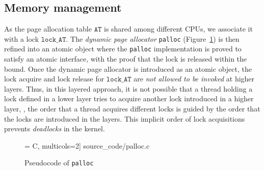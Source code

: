 {\subsection{Memory management}
\label{sec:con:mem}


As the page allocation table $\texttt{AT}$ is shared among different CPUs, 
we associate it with a lock $\texttt{lock\_AT}$.
The \emph{dynamic page allocator}
\texttt{palloc} (\cf Figure~\ref{fig:exp:palloc}) is then refined into an atomic object where
the \texttt{palloc} implementation is proved to satisfy an atomic interface,
with the proof that the lock is released within the bound.
Once the dynamic page allocator is introduced as
 an atomic object, the lock acquire and lock release 
for $\texttt{lock\_AT}$
are \emph{not allowed to be invoked} at higher layers. 
Thus, in this layered approach, it is not possible
that a thread holding a lock defined in a lower layer tries to acquire another lock
introduced in a higher layer, \ie, the order that a thread acquires different
locks is guided by the order that the locks are introduced in the layers.
This implicit order of lock acquisitions prevents \emph{deadlocks} in the
{\cCTOS} kernel.

\begin{figure}[t]
 = C, multicols=2] {source_code/palloc.c}
\caption{Pseudocode of \texttt{palloc}}
\label{fig:exp:palloc}
\hrulefill
\end{figure}



}
